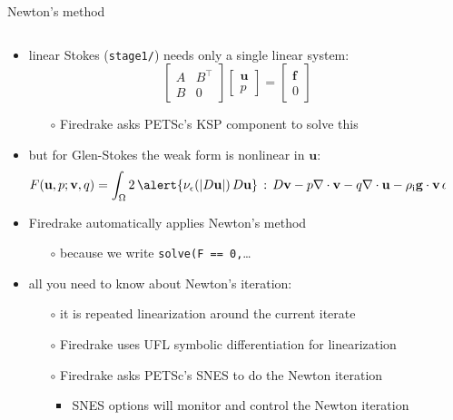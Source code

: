 \documentclass[10pt,hyperref,dvipsnames]{beamer}
\newcommand{\bbf}{\mathbf{f}}
\newcommand{\bv}{\mathbf{v}}
\newcommand{\bu}{\mathbf{u}}
\newcommand{\eps}{\epsilon}
\newcommand{\rhoi}{\rho_{\text{i}}}
\begin{document}
\begin{frame}{Newton's method}

\begin{columns}
\begin{column}{0.8\textwidth}
\begin{itemize}
\item linear Stokes \small (\texttt{stage1/}) \normalsize needs only a single linear system:
  $$\begin{bmatrix} A & B^\top \\ B & 0 \end{bmatrix} \begin{bmatrix} \bu \\ p  \end{bmatrix} = \begin{bmatrix} \bbf \\ 0 \end{bmatrix}$$
    \begin{itemize}
    \item[$\circ$] Firedrake asks PETSc's KSP component to solve this
    \end{itemize}
\item but for Glen-Stokes the weak form is nonlinear in $\bu$:
\small
$$F(\bu,p;\bv,q) = \int_{\Omega} 2\, \alert{\nu_\eps(|D\bu|)\, D\bu}\,:\,D\bv - p \nabla \cdot \bv - q \nabla \cdot \bu - \rhoi \mathbf{g} \cdot \bv \,dx$$
\normalsize
\item Firedrake automatically applies Newton's method
    \begin{itemize}
    \item[$\circ$] because we write \texttt{solve(F == 0,}\dots
    \end{itemize}
\item all you need to know about Newton's iteration:
    \begin{itemize}
    \item[$\circ$] it is repeated linearization around the current iterate
    \item[$\circ$] Firedrake uses UFL symbolic differentiation for linearization
    \item[$\circ$] Firedrake asks PETSc's SNES to do the Newton iteration
        \begin{itemize}
        \item SNES options will monitor and control the Newton iteration
        \end{itemize}
    \end{itemize}
\end{itemize}
\end{column}
\begin{column}{0.2\textwidth}
\vspace{25mm}


\end{column}
\end{columns}
\end{frame}
\end{document}
